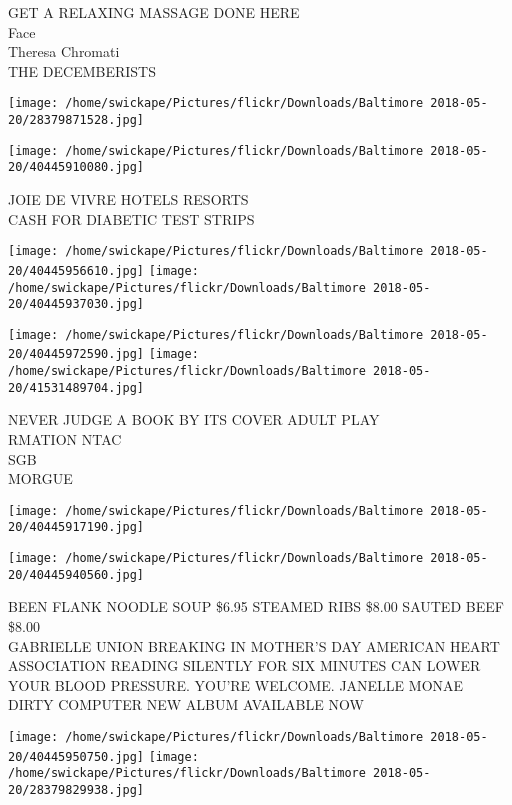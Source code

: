 \documentclass[10pt,letterpaper]{article}
\begin{document}
GET A RELAXING MASSAGE DONE HERE\\
Face\\
Theresa Chromati\\
THE DECEMBERISTS\\
\pagebreak

\texttt{[image: /home/swickape/Pictures/flickr/Downloads/Baltimore 2018-05-20/28379871528.jpg]}

\vspace{0.25in}
\texttt{[image: /home/swickape/Pictures/flickr/Downloads/Baltimore 2018-05-20/40445910080.jpg]}

JOIE DE VIVRE HOTELS RESORTS\\
CASH FOR DIABETIC TEST STRIPS\\
\pagebreak

\texttt{[image: /home/swickape/Pictures/flickr/Downloads/Baltimore 2018-05-20/40445956610.jpg]}
\texttt{[image: /home/swickape/Pictures/flickr/Downloads/Baltimore 2018-05-20/40445937030.jpg]}

\texttt{[image: /home/swickape/Pictures/flickr/Downloads/Baltimore 2018-05-20/40445972590.jpg]}
\texttt{[image: /home/swickape/Pictures/flickr/Downloads/Baltimore 2018-05-20/41531489704.jpg]}

NEVER JUDGE A BOOK BY ITS COVER ADULT PLAY\\
RMATION NTAC\\
SGB\\
MORGUE\\
\pagebreak

\texttt{[image: /home/swickape/Pictures/flickr/Downloads/Baltimore 2018-05-20/40445917190.jpg]}

\vspace{0.25in}
\texttt{[image: /home/swickape/Pictures/flickr/Downloads/Baltimore 2018-05-20/40445940560.jpg]}

BEEN FLANK NOODLE SOUP \$6.95 STEAMED RIBS \$8.00 SAUTED BEEF \$8.00\\
GABRIELLE UNION BREAKING IN MOTHER'S DAY AMERICAN HEART ASSOCIATION READING SILENTLY FOR SIX MINUTES CAN LOWER YOUR BLOOD PRESSURE.  YOU'RE WELCOME. JANELLE MONAE DIRTY COMPUTER NEW ALBUM AVAILABLE NOW\\
\pagebreak

\texttt{[image: /home/swickape/Pictures/flickr/Downloads/Baltimore 2018-05-20/40445950750.jpg]}
\texttt{[image: /home/swickape/Pictures/flickr/Downloads/Baltimore 2018-05-20/28379829938.jpg]}
\end{document}
